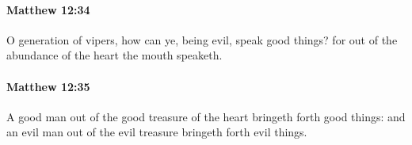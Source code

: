 		\paragraph{Matthew 12:34} %
			\label{MATTHEW-12-34}

			O generation of vipers, how can ye, being evil, speak good things? for out of the abundance of the heart the mouth speaketh.

			\begin{framed}
			\scriptsize
				\begin{compactdesc}
					\item[SBLG] 
				\end{compactdesc}
			\end{framed}

		\paragraph{Matthew 12:35} %
			\label{MATTHEW-12-35}

			A good man out of the good treasure of the heart bringeth forth good things: and an evil man out of the evil treasure bringeth forth evil things.

